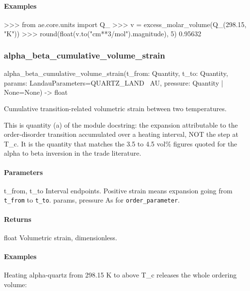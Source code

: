 \documentclass[10pt,a4paper,twoside]{report}
\begin{document}
\paragraph*{Examples}

\begin{doctestblock}
>>> from ae.core.units import Q_
>>> v = excess_molar_volume(Q_(298.15, "K"))
>>> round(float(v.to("cm**3/mol").magnitude), 5)
0.95632
\end{doctestblock}

\subsubsection*{alpha\_beta\_cumulative\_volume\_strain}

\begin{verbatimsmall}
alpha_beta_cumulative_volume_strain(t_from: Quantity, t_to: Quantity, params: LandauParameters=QUARTZ_LAND
    \ AU, pressure: Quantity | None=None) -> float
\end{verbatimsmall}

Cumulative transition-related volumetric strain between two temperatures.

This is quantity (a) of the module docstring: the expansion attributable to the order-disorder transition accumulated over a heating interval, NOT the step at T\_c. It is the quantity that matches the 3.5 to 4.5 vol\% figures quoted for the alpha to beta inversion in the trade literature.

\paragraph*{Parameters}

t\_from, t\_to Interval endpoints. Positive strain means expansion going from \texttt{t\_from} to \texttt{t\_to}. params, pressure As for \texttt{order\_parameter}.

\paragraph*{Returns}

float Volumetric strain, dimensionless.

\paragraph*{Examples}

Heating alpha-quartz from 298.15 K to above T\_c releases the whole ordering volume:
\end{document}
